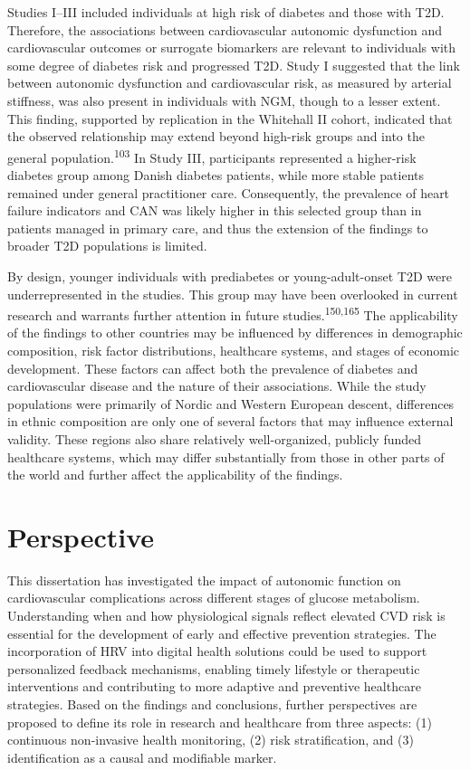 \documentclass[
  a4paper,
  headsepline=true,
  open=left]{scrbook}
\begin{document}
Studies I--III included individuals at high risk of diabetes and those
with T2D. Therefore, the associations between cardiovascular autonomic
dysfunction and cardiovascular outcomes or surrogate biomarkers are
relevant to individuals with some degree of diabetes risk and progressed
T2D. Study I suggested that the link between autonomic dysfunction and
cardiovascular risk, as measured by arterial stiffness, was also present
in individuals with NGM, though to a lesser extent. This finding,
supported by replication in the Whitehall II cohort, indicated that the
observed relationship may extend beyond high-risk groups and into the
general population.\textsuperscript{103} In Study III, participants
represented a higher-risk diabetes group among Danish diabetes patients,
while more stable patients remained under general practitioner care.
Consequently, the prevalence of heart failure indicators and CAN was
likely higher in this selected group than in patients managed in primary
care, and thus the extension of the findings to broader T2D populations
is limited.

By design, younger individuals with prediabetes or young-adult-onset T2D
were underrepresented in the studies. This group may have been
overlooked in current research and warrants further attention in future
studies.\textsuperscript{150,165} The applicability of the findings to
other countries may be influenced by differences in demographic
composition, risk factor distributions, healthcare systems, and stages
of economic development. These factors can affect both the prevalence of
diabetes and cardiovascular disease and the nature of their
associations. While the study populations were primarily of Nordic and
Western European descent, differences in ethnic composition are only one
of several factors that may influence external validity. These regions
also share relatively well-organized, publicly funded healthcare
systems, which may differ substantially from those in other parts of the
world and further affect the applicability of the findings.


\hypertarget{perspective}{%
\chapter{Perspective}\label{perspective}}

\clearpage
\null
\thispagestyle{empty}
\clearpage

This dissertation has investigated the impact of autonomic function on
cardiovascular complications across different stages of glucose
metabolism. Understanding when and how physiological signals reflect
elevated CVD risk is essential for the development of early and
effective prevention strategies. The incorporation of HRV into digital
health solutions could be used to support personalized feedback
mechanisms, enabling timely lifestyle or therapeutic interventions and
contributing to more adaptive and preventive healthcare strategies.
Based on the findings and conclusions, further perspectives are proposed
to define its role in research and healthcare from three aspects: (1)
continuous non-invasive health monitoring, (2) risk stratification, and
(3) identification as a causal and modifiable marker.
\end{document}
